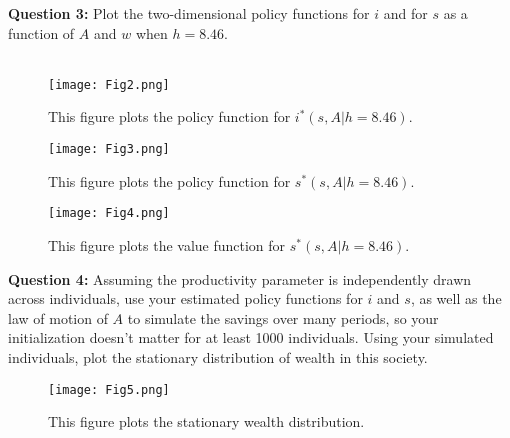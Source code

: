 \documentclass[11pt]{article}
\begin{document}
\textbf{Question 3:} Plot the two-dimensional policy functions for $i$ and for $s$ as a function of $A$ and $w$ when $h=8.46$.  \\
\ \\
\begin{figure}[ht!]
\centering
\texttt{[image: Fig2.png]}
\caption{This figure plots the policy function for $i^*(s,A|h=8.46)$.}
\end{figure}

\begin{figure}[ht!]
\centering
\texttt{[image: Fig3.png]}
\caption{This figure plots the policy function for $s^*(s,A|h=8.46)$.}
\end{figure}

\begin{figure}[ht!]
\centering
\texttt{[image: Fig4.png]}
\caption{This figure plots the value function for $s^*(s,A|h=8.46)$.}
\end{figure}


\textbf{Question 4:} Assuming the productivity parameter is independently drawn across individuals, use your estimated policy functions for $i$ and $s$, as well as the law of motion of $A$ to simulate the savings over many periods, so your initialization doesn't matter for at least 1000 individuals.  Using your simulated individuals, plot the stationary distribution of wealth in this society.

\begin{figure}[ht!]
\centering
\texttt{[image: Fig5.png]}
\caption{This figure plots the stationary wealth distribution.}
\end{figure}
\end{document}
